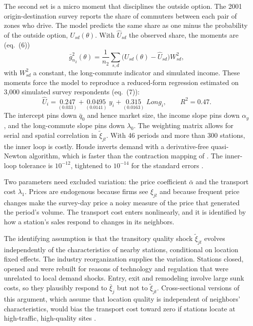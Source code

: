 The second set is a micro moment that disciplines the outside option. The 2001 origin-destination survey reports
the share of commuters between each pair of zones who drive. The model predicts the same share as one minus the
probability of the outside option, $U_{sd}(\theta)$. With $\hat U_{sd}$ the observed share, the moments are
(eq.~(6))
\begin{equation}\label{eq:11-houde-m2}
\bar g^2_{n_2}(\theta) = \frac{1}{n_2}\sum_{s,d}\big(U_{sd}(\theta) - \hat U_{sd}\big)W^2_{sd},
\end{equation}
with $W^2_{sd}$ a constant, the long-commute indicator and simulated income. These moments force the model to
reproduce a reduced-form regression estimated on 3,000 simulated survey respondents (eq.~(7)):
\begin{equation}\label{eq:11-houde-carreg}
\hat U_i = \underset{(0.033)}{0.247} + \underset{(0.0141)}{0.0495}\; y_i + \underset{(0.0163)}{0.315}\;
\mathit{Long}_i, \qquad R^2 = 0.47 .
\end{equation}
The intercept pins down $\bar q_0$ and hence market size, the income slope pins down $\alpha_y$, and the
long-commute slope pins down $\lambda_0$. The weighting matrix allows for serial and spatial correlation in
$\tilde\xi_{jt}$. With 46 periods and more than 300 stations, the inner loop is costly. Houde inverts demand with a
derivative-free quasi-Newton algorithm, which is faster than the contraction mapping of
\citet{BerryLevinsohnPakes1995}. The inner-loop tolerance is $10^{-12}$, tightened to $10^{-14}$ for the standard
errors \citep[p.~2160, n.~27]{Houde2012}.

Two parameters need excluded variation: the price coefficient $\bar\alpha$ and the transport cost $\lambda_1$. Prices
are endogenous because firms see $\xi_{jt}$ and because frequent price changes make the survey-day price a noisy
measure of the price that generated the period's volume. The transport cost enters nonlinearly, and it is identified
by how a station's sales respond to changes in its neighbors.

The identifying assumption is that the transitory quality shock $\tilde\xi_{jt}$ evolves independently of the
characteristics of nearby stations, conditional on location fixed effects. The industry reorganization supplies the
variation. Stations closed, opened and were rebuilt for reasons of technology and regulation that were unrelated to
local demand shocks. Entry, exit and remodeling involve large sunk costs, so they plausibly respond to $\bar\xi_j$
but not to $\tilde\xi_{jt}$. Cross-sectional versions of this argument, which assume that location quality is
independent of neighbors' characteristics, would bias the transport cost toward zero if stations locate at
high-traffic, high-quality sites \citep[p.~2160]{Houde2012}.

